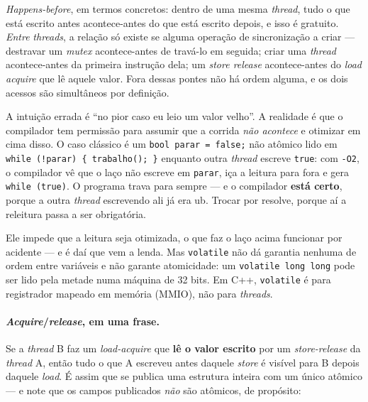 \emph{Happens-before}, em termos concretos: dentro de uma mesma \emph{thread},
tudo o que está escrito antes acontece-antes do que está escrito depois, e isso
é gratuito. \emph{Entre} \emph{threads}, a relação só existe se alguma operação
de sincronização a criar --- destravar um \emph{mutex} acontece-antes de
travá-lo em seguida; criar uma \emph{thread} acontece-antes da primeira
instrução dela; um \emph{store release} acontece-antes do \emph{load acquire}
que lê aquele valor. Fora dessas pontes não há ordem alguma, e os dois acessos
são simultâneos por definição.

\begin{armadilha}
A intuição errada é ``no pior caso eu leio um valor velho''. A realidade é que o
compilador tem permissão para assumir que a corrida \emph{não acontece} e
otimizar em cima disso. O caso clássico é um \texttt{bool parar = false;} não
atômico lido em \texttt{while (!parar) \{ trabalho(); \}} enquanto outra
\emph{thread} escreve \texttt{true}: com \texttt{-O2}, o compilador vê que o
laço não escreve em \texttt{parar}, iça a leitura para fora e gera
\texttt{while (true)}. O programa trava para sempre --- e o compilador
\textbf{está certo}, porque a outra \emph{thread} escrevendo ali já era
\gls{ub}. Trocar por  resolve, porque aí a releitura
passa a ser obrigatória.
\end{armadilha}

\begin{armadilha}
Ele impede que a leitura seja otimizada, o que faz o laço acima funcionar por
acidente --- e é daí que vem a lenda. Mas \texttt{volatile} não dá garantia
nenhuma de ordem entre variáveis e não garante atomicidade: um
\texttt{volatile long long} pode ser lido pela metade numa máquina de 32 bits.
Em C++, \texttt{volatile} é para registrador mapeado em memória (MMIO), não para
\emph{threads}.
\end{armadilha}

\paragraph{\emph{Acquire}/\emph{release}, em uma frase.} Se a \emph{thread} B
faz um \emph{load-acquire} que \textbf{lê o valor escrito} por um
\emph{store-release} da \emph{thread} A, então tudo o que A escreveu antes
daquele \emph{store} é visível para B depois daquele \emph{load}. É assim que se
publica uma estrutura inteira com um único atômico --- e note que os campos
publicados \emph{não} são atômicos, de propósito:

